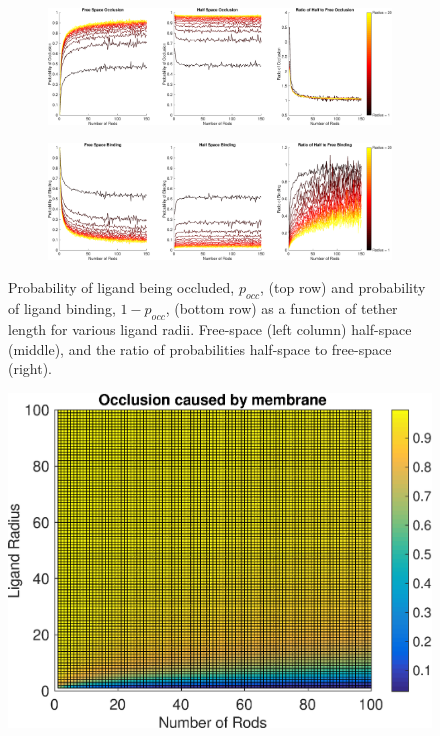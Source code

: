 \documentclass[../../AdvancementSummary.tex]{subfiles}
\begin{document}
\begin{figure}[H]
    \begin{center}
        \begin{subfigure}{\linewidth}
        		\includegraphics[width=\linewidth]{ResultsFigures/BindingSurfaceFactor/OcclusionVSN.eps}
        		\caption{}
        \end{subfigure}
        	\begin{subfigure}{\linewidth}
        		\includegraphics[width=\linewidth]{ResultsFigures/BindingSurfaceFactor/BindingVSN.eps}
        		\caption{}
        \end{subfigure}
        \caption{Probability of ligand being occluded, $p_{occ}$, (top row) and probability of ligand binding, $1-p_{occ}$, (bottom row) as a function of tether length for various ligand radii. Free-space (left column) half-space (middle), and the ratio of probabilities half-space to free-space (right). \label{fig: OcclusionVSN} }
       \end{center}
\end{figure}
       
       
       \begin{figure}[H]
       \begin{center}
       \includegraphics[width=0.8\linewidth]{ResultsFigures/MembraneCausedOcclusion/MembraneCausedOcclusionVSNVSirLigand.eps}
       \end{center}
       \caption{}
       \end{figure}
       
\end{document}
